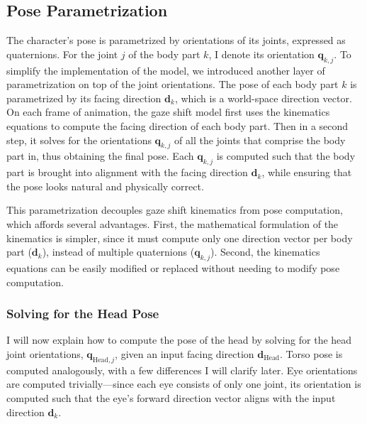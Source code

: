 \subsection{Pose Parametrization}
\label{sec:GazeShiftPose}

The character's pose is parametrized by orientations of its joints, expressed as quaternions. For the joint $j$ of the body part $k$, I denote its orientation $\mathbf{q}_{k,j}$. To simplify the implementation of the model, we introduced another layer of parametrization on top of the joint orientations. The pose of each body part $k$ is parametrized by its facing direction $\mathbf{d}_k$, which is a world-space direction vector. On each frame of animation, the gaze shift model first uses the kinematics equations to compute the facing direction of each body part. Then in a second step, it solves for the orientations $\mathbf{q}_{k,j}$ of all the joints that comprise the body part in, thus obtaining the final pose. Each $\mathbf{q}_{k,j}$ is computed such that the body part is brought into alignment with the facing direction $\mathbf{d}_k$, while ensuring that the pose looks natural and physically correct.

This parametrization decouples gaze shift kinematics from pose computation, which affords several advantages. First, the mathematical formulation of the kinematics is simpler, since it must compute only one direction vector per body part ($\mathbf{d}_k$), instead of multiple quaternions ($\mathbf{q}_{k,j}$). Second, the kinematics equations can be easily modified or replaced without needing to modify pose computation.

\subsubsection{Solving for the Head Pose}

I will now explain how to compute the pose of the head by solving for the head joint orientations, $\mathbf{q}_{\mathrm{Head},j}$, given an input facing direction $\mathbf{d}_{\mathrm{Head}}$. Torso pose is computed analogously, with a few differences I will clarify later. Eye orientations are computed trivially---since each eye consists of only one joint, its orientation is computed such that the eye's forward direction vector aligns with the input direction $\mathbf{d}_k$.

